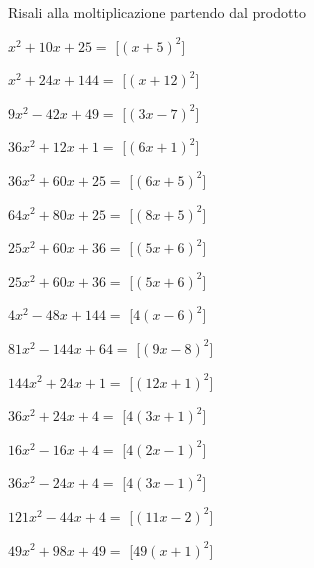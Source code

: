 \begin{esercizio}
 \label{ese:11.11}
Risali alla moltiplicazione partendo dal prodotto

\begin{multicols}{2}
\begin{enumeratea}
\spazielenx
\item \(x^{2} + 10 x + 25=\) 
\hfill [\(\left(x + 5\right)^{2}\)]
\item \(x^{2} + 24 x + 144=\) 
\hfill [\(\left(x + 12\right)^{2}\)]
\item \(9 x^{2} - 42 x + 49=\) 
\hfill [\(\left(3 x - 7\right)^{2}\)]
\item \(36 x^{2} + 12 x + 1=\) 
\hfill [\(\left(6 x + 1\right)^{2}\)]
\item \(36 x^{2} + 60 x + 25=\) 
\hfill [\(\left(6 x + 5\right)^{2}\)]
\item \(64 x^{2} + 80 x + 25=\) 
\hfill [\(\left(8 x + 5\right)^{2}\)]
\item \(25 x^{2} + 60 x + 36=\) 
\hfill [\(\left(5 x + 6\right)^{2}\)]
\item \(25 x^{2} + 60 x + 36=\) 
\hfill [\(\left(5 x + 6\right)^{2}\)]
\item \(4 x^{2} - 48 x + 144=\) 
\hfill [\(4 \left(x - 6\right)^{2}\)]
\item \(81 x^{2} - 144 x + 64=\) 
\hfill [\(\left(9 x - 8\right)^{2}\)]
\item \(144 x^{2} + 24 x + 1=\) 
\hfill [\(\left(12 x + 1\right)^{2}\)]
\item \(36 x^{2} + 24 x + 4=\) 
\hfill [\(4 \left(3 x + 1\right)^{2}\)]
\item \(16 x^{2} - 16 x + 4=\) 
\hfill [\(4 \left(2 x - 1\right)^{2}\)]
\item \(36 x^{2} - 24 x + 4=\) 
\hfill [\(4 \left(3 x - 1\right)^{2}\)]
\item \(121 x^{2} - 44 x + 4=\) 
\hfill [\(\left(11 x - 2\right)^{2}\)]
\item \(49 x^{2} + 98 x + 49=\) 
\hfill [\(49 \left(x + 1\right)^{2}\)]

\end{enumeratea}
\end{multicols}
\end{esercizio}
